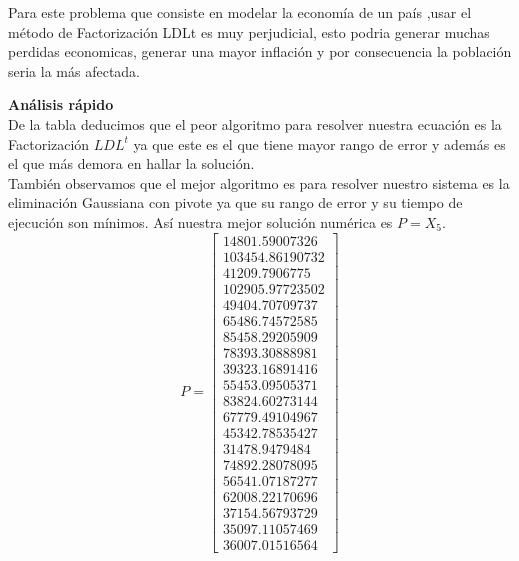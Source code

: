 \documentclass[10pt,a4paper]{article}
\begin{document}
\begin{multicols}{2}
	\noindent Para este problema que consiste en modelar la economía de un país ,usar el método de Factorización LDLt es muy perjudicial, esto podria generar muchas perdidas economicas, generar una mayor inflación y por consecuencia la población seria la más afectada.
	
	\noindent \textbf{Análisis rápido} \\
	De la tabla deducimos que el peor algoritmo para resolver nuestra ecuación es la Factorización $LDL^t$ ya que este es el que tiene mayor rango de error y además es el que más demora en hallar la solución.\\ También observamos que el mejor algoritmo es para resolver nuestro sistema es la eliminación Gaussiana con pivote ya que su rango de error y su tiempo de ejecución son mínimos. Así nuestra mejor solución numérica es $P=X_5$.
	\begin{equation*}
	P=
	\begin{bmatrix}
	14801.59007326\\  
	103454.86190732\\   
	41209.7906775 \\
	102905.97723502\\   
	49404.70709737\\   
	65486.74572585\\
	85458.29205909\\   
	78393.30888981\\   
	39323.16891416\\
	55453.09505371\\   
	83824.60273144\\   
	67779.49104967\\
	45342.78535427\\   
	31478.9479484 \\   
	74892.28078095\\
	56541.07187277\\   
	62008.22170696\\   
	37154.56793729\\
	35097.11057469\\   
	36007.01516564
	\end{bmatrix}
	\end{equation*}
	

\end{multicols}
\end{document}
